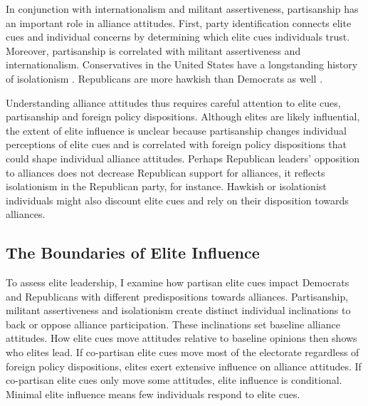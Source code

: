\documentclass[12pt]{article}
\begin{document}
In conjunction with internationalism and militant assertiveness, partisanship has an important role in alliance attitudes. 
First, party identification connects elite cues and individual concerns by determining which elite cues individuals trust.
Moreover, partisanship is correlated with militant assertiveness and internationalism. 
Conservatives in the United States have a longstanding history of isolationism \citep{Kupchan2020}.
Republicans are more hawkish than Democrats as well \citep{Gries2014}. 


Understanding alliance attitudes thus requires careful attention to elite cues, partisanship and foreign policy dispositions. 
Although elites are likely influential, the extent of elite influence is unclear because partisanship changes individual perceptions of elite cues and is correlated with foreign policy dispositions that could shape individual alliance attitudes. 
Perhaps Republican leaders' opposition to alliances does not decrease Republican support for alliances, it reflects isolationism in the Republican party, for instance. 
Hawkish or isolationist individuals might also discount elite cues and rely on their disposition towards alliances. 



\subsection{The Boundaries of Elite Influence}


To assess elite leadership, I examine how partisan elite cues impact Democrats and Republicans with different predispositions towards alliances.
Partisanship, militant assertiveness and isolationism create distinct individual inclinations to back or oppose alliance participation. 
These inclinations set baseline alliance attitudes. 
How elite cues move attitudes relative to baseline opinions then shows who elites lead. 
If co-partisan elite cues move most of the electorate regardless of foreign policy dispositions, elites exert extensive influence on alliance attitudes. 
If co-partisan elite cues only move some attitudes, elite influence is conditional. 
Minimal elite influence means few individuals respond to elite cues. 
\end{document}

